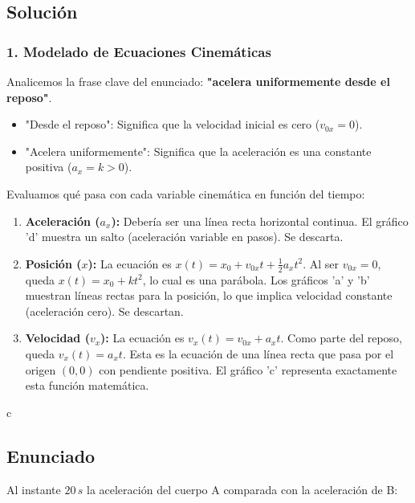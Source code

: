 \documentclass[12pt, a4paper]{article}
\begin{document}
\subsection*{Solución}

\subsubsection*{1. Modelado de Ecuaciones Cinemáticas}
Analicemos la frase clave del enunciado: \textbf{"acelera uniformemente desde el reposo"}.
\begin{itemize}
    \item "Desde el reposo": Significa que la velocidad inicial es cero ($v_{0x} = 0$).
    \item "Acelera uniformemente": Significa que la aceleración es una constante positiva ($a_x = k > 0$).
\end{itemize}

Evaluamos qué pasa con cada variable cinemática en función del tiempo:
\begin{enumerate}
    \item \textbf{Aceleración ($a_x$):} Debería ser una línea recta horizontal continua. El gráfico 'd' muestra un salto (aceleración variable en pasos). Se descarta.
    \item \textbf{Posición ($x$):} La ecuación es $x(t) = x_0 + v_{0x}t + \frac{1}{2}a_x t^2$. Al ser $v_{0x}=0$, queda $x(t) = x_0 + k t^2$, lo cual es una parábola. Los gráficos 'a' y 'b' muestran líneas rectas para la posición, lo que implica velocidad constante (aceleración cero). Se descartan.
    \item \textbf{Velocidad ($v_x$):} La ecuación es $v_x(t) = v_{0x} + a_x t$. Como parte del reposo, queda $v_x(t) = a_x t$. Esta es la ecuación de una línea recta que pasa por el origen $(0,0)$ con pendiente positiva. El gráfico 'c' representa exactamente esta función matemática.
\end{enumerate}

\begin{tcolorbox}[colback=green!5!white, colframe=green!50!black, title=Respuesta Final]
\centering \Large c
\end{tcolorbox}

\newpage

\subsection*{Enunciado}
Al instante $20\,\si{s}$ la aceleración del cuerpo A comparada con la aceleración de B:
\end{document}
